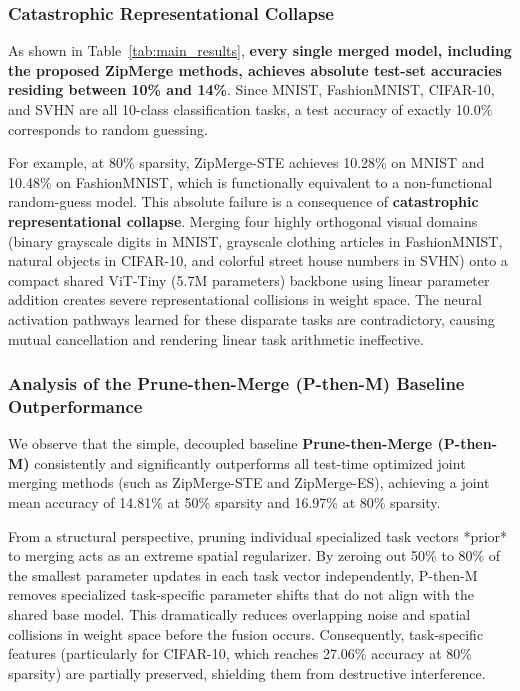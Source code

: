 \subsubsection{Catastrophic Representational Collapse}
As shown in Table~\ref{tab:main_results}, \textbf{every single merged model, including the proposed ZipMerge methods, achieves absolute test-set accuracies residing between 10\% and 14\%}. Since MNIST, FashionMNIST, CIFAR-10, and SVHN are all 10-class classification tasks, a test accuracy of exactly 10.0\% corresponds to random guessing. 

For example, at 80\% sparsity, ZipMerge-STE achieves 10.28\% on MNIST and 10.48\% on FashionMNIST, which is functionally equivalent to a non-functional random-guess model. This absolute failure is a consequence of \textbf{catastrophic representational collapse}. Merging four highly orthogonal visual domains (binary grayscale digits in MNIST, grayscale clothing articles in FashionMNIST, natural objects in CIFAR-10, and colorful street house numbers in SVHN) onto a compact shared ViT-Tiny (5.7M parameters) backbone using linear parameter addition creates severe representational collisions in weight space. The neural activation pathways learned for these disparate tasks are contradictory, causing mutual cancellation and rendering linear task arithmetic ineffective.

\subsubsection{Analysis of the Prune-then-Merge (P-then-M) Baseline Outperformance}
We observe that the simple, decoupled baseline \textbf{Prune-then-Merge (P-then-M)} consistently and significantly outperforms all test-time optimized joint merging methods (such as ZipMerge-STE and ZipMerge-ES), achieving a joint mean accuracy of 14.81\% at 50\% sparsity and 16.97\% at 80\% sparsity. 

From a structural perspective, pruning individual specialized task vectors *prior* to merging acts as an extreme spatial regularizer. By zeroing out 50\% to 80\% of the smallest parameter updates in each task vector independently, P-then-M removes specialized task-specific parameter shifts that do not align with the shared base model. This dramatically reduces overlapping noise and spatial collisions in weight space before the fusion occurs. Consequently, task-specific features (particularly for CIFAR-10, which reaches 27.06\% accuracy at 80\% sparsity) are partially preserved, shielding them from destructive interference.

